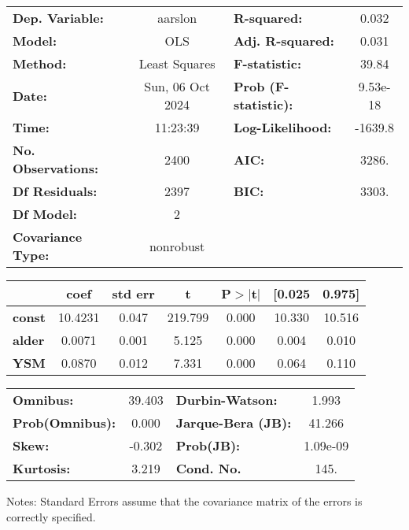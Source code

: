 \begin{center}
\begin{tabular}{lclc}
\toprule
\textbf{Dep. Variable:}    &     aarslon      & \textbf{  R-squared:         } &     0.032   \\
\textbf{Model:}            &       OLS        & \textbf{  Adj. R-squared:    } &     0.031   \\
\textbf{Method:}           &  Least Squares   & \textbf{  F-statistic:       } &     39.84   \\
\textbf{Date:}             & Sun, 06 Oct 2024 & \textbf{  Prob (F-statistic):} &  9.53e-18   \\
\textbf{Time:}             &     11:23:39     & \textbf{  Log-Likelihood:    } &   -1639.8   \\
\textbf{No. Observations:} &        2400      & \textbf{  AIC:               } &     3286.   \\
\textbf{Df Residuals:}     &        2397      & \textbf{  BIC:               } &     3303.   \\
\textbf{Df Model:}         &           2      & \textbf{                     } &             \\
\textbf{Covariance Type:}  &    nonrobust     & \textbf{                     } &             \\
\bottomrule
\end{tabular}
\begin{tabular}{lcccccc}
               & \textbf{coef} & \textbf{std err} & \textbf{t} & \textbf{P$> |$t$|$} & \textbf{[0.025} & \textbf{0.975]}  \\
\midrule
\textbf{const} &      10.4231  &        0.047     &   219.799  &         0.000        &       10.330    &       10.516     \\
\textbf{alder} &       0.0071  &        0.001     &     5.125  &         0.000        &        0.004    &        0.010     \\
\textbf{YSM}   &       0.0870  &        0.012     &     7.331  &         0.000        &        0.064    &        0.110     \\
\bottomrule
\end{tabular}
\begin{tabular}{lclc}
\textbf{Omnibus:}       & 39.403 & \textbf{  Durbin-Watson:     } &    1.993  \\
\textbf{Prob(Omnibus):} &  0.000 & \textbf{  Jarque-Bera (JB):  } &   41.266  \\
\textbf{Skew:}          & -0.302 & \textbf{  Prob(JB):          } & 1.09e-09  \\
\textbf{Kurtosis:}      &  3.219 & \textbf{  Cond. No.          } &     145.  \\
\bottomrule
\end{tabular}
\end{center}

Notes: \newline
 [1] Standard Errors assume that the covariance matrix of the errors is correctly specified.